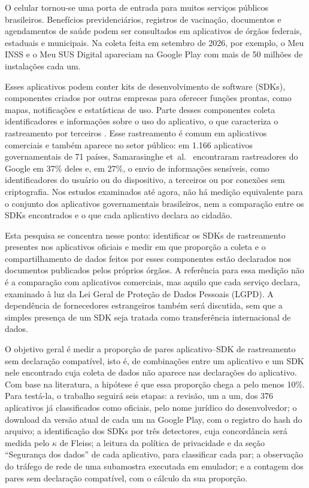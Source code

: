 \label{sec:introducao}

O celular tornou-se uma porta de entrada para muitos serviços públicos brasileiros. Benefícios previdenciários, registros de vacinação, documentos e agendamentos de saúde podem ser consultados em aplicativos de órgãos federais, estaduais e municipais. Na coleta feita em setembro de 2026, por exemplo, o Meu INSS e o Meu SUS Digital apareciam na Google Play com mais de 50 milhões de instalações cada um.

Esses aplicativos podem conter kits de desenvolvimento de software (SDKs), componentes criados por outras empresas para oferecer funções prontas, como mapas, notificações e estatísticas de uso. Parte desses componentes coleta identificadores e informações sobre o uso do aplicativo, o que caracteriza o rastreamento por terceiros \cite{binns2018}. Esse rastreamento é comum em aplicativos comerciais \cite{binns2018,kollnig2021before} e também aparece no setor público: em 1.166 aplicativos governamentais de 71 países, Samarasinghe et~al.~\cite{samarasinghe2022} encontraram rastreadores do Google em 37\% deles e, em 27\%, o envio de informações sensíveis, como identificadores do usuário ou do dispositivo, a terceiros ou por conexões sem criptografia. Nos estudos examinados até agora, não há medição equivalente para o conjunto dos aplicativos governamentais brasileiros, nem a comparação entre os SDKs encontrados e o que cada aplicativo declara ao cidadão.

Esta pesquisa se concentra nesse ponto: identificar os SDKs de rastreamento presentes nos aplicativos oficiais e medir em que proporção a coleta e o compartilhamento de dados feitos por esses componentes estão declarados nos documentos publicados pelos próprios órgãos. A referência para essa medição não é a comparação com aplicativos comerciais, mas aquilo que cada serviço declara, examinado à luz da Lei Geral de Proteção de Dados Pessoais (LGPD). A dependência de fornecedores estrangeiros também será discutida, sem que a simples presença de um SDK seja tratada como transferência internacional de dados.

O objetivo geral é medir a proporção de pares aplicativo--SDK de rastreamento sem declaração compatível, isto é, de combinações entre um aplicativo e um SDK nele encontrado cuja coleta de dados não aparece nas declarações do aplicativo. Com base na literatura, a hipótese é que essa proporção chega a pelo menos 10\%. Para testá-la, o trabalho seguirá seis etapas: a revisão, um a um, dos 376 aplicativos já classificados como oficiais, pelo nome jurídico do desenvolvedor; o download da versão atual de cada um na Google Play, com o registro do hash do arquivo; a identificação dos SDKs por três detectores, cuja concordância será medida pelo $\kappa$ de Fleiss; a leitura da política de privacidade e da seção ``Segurança dos dados'' de cada aplicativo, para classificar cada par; a observação do tráfego de rede de uma subamostra executada em emulador; e a contagem dos pares sem declaração compatível, com o cálculo da sua proporção.

